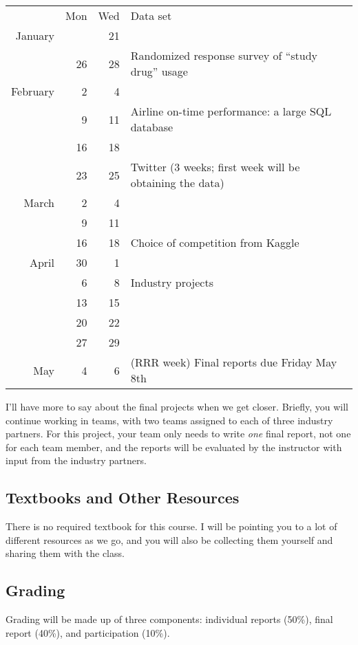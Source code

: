 \documentclass[11pt]{article}
\begin{document}
\vspace{1em}
\begin{tabular}{r|r|r|l}
& Mon & Wed & Data set\\
January & & 21 &\\
& 26 & 28 & Randomized response survey of ``study drug'' usage\\
February & 2 & 4 &\\
& 9 & 11 & Airline on-time performance: a large SQL database\\ 
& 16 & 18 &\\
& 23 & 25 & Twitter (3 weeks; first week will be obtaining the data)\\
March & 2 & 4 &\\
& 9 & 11\\
& 16 & 18 & Choice of competition from Kaggle\\
April & 30 & 1 \\
& 6 & 8 & Industry projects\\
& 13 & 15 &\\
& 20 & 22 &\\
& 27 & 29 &\\
May & 4 & 6 & (RRR week) Final reports due Friday May 8th
\end{tabular}
\vspace{1em}

I'll have more to say about the final projects when we get closer. Briefly, you will continue working in teams, with two teams assigned to each of three industry partners. For this project, your team only needs to write {\em one} final report, not one for each team member, and the reports will be evaluated by the instructor with input from the industry partners.

\subsection*{Textbooks and Other Resources}

There is no required textbook for this course.  I will be pointing you to a lot of different resources as we go, and you will also be collecting them yourself and sharing them with the class. 

\subsection*{Grading}

Grading will be made up of three components: individual reports (50\%), final report (40\%), and participation (10\%). 
\end{document}
